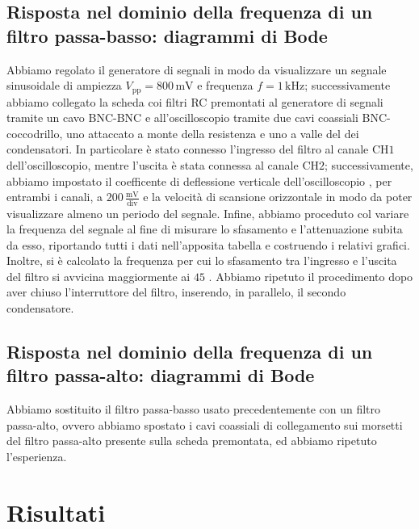 \documentclass{article}
\begin{document}
		\subsection{Risposta nel dominio della frequenza di un filtro passa-basso: diagrammi di Bode}
			Abbiamo regolato il generatore di segnali in modo da visualizzare un segnale sinusoidale di ampiezza $ V_{\mathrm{pp}} = 800 \, \mathrm{mV} $ e frequenza $ f = 1 \, \mathrm{kHz} $; successivamente abbiamo collegato la scheda coi filtri RC premontati al generatore di segnali tramite un cavo BNC-BNC e all'oscilloscopio tramite due cavi coassiali BNC-coccodrillo, uno attaccato a monte della resistenza e uno a valle del dei condensatori.
			\newline
			In particolare è stato connesso l'ingresso del filtro al canale $ \mathrm{CH1} $ dell'oscilloscopio, mentre l'uscita è stata connessa al canale $ \mathrm{CH2} $; successivamente, abbiamo impostato il coefficente di deflessione verticale dell'oscilloscopio , per entrambi i canali, a $ 200 \, \mathrm{\frac{mV}{div}} $ e la velocità di scansione orizzontale in modo da poter visualizzare almeno un periodo del segnale.
			\newline
			Infine, abbiamo proceduto col variare la frequenza del segnale al fine di misurare lo sfasamento e l'attenuazione subita da esso, riportando tutti i dati nell'apposita tabella e costruendo i relativi grafici. Inoltre, si è calcolato la frequenza per cui lo sfasamento tra l'ingresso e l'uscita del filtro si avvicina maggiormente ai $ 45 $ \textdegree.
			\newline
			Abbiamo ripetuto il procedimento dopo aver chiuso l'interruttore del filtro, inserendo, in parallelo, il secondo condensatore.
		\subsection{Risposta nel dominio della frequenza di un filtro passa-alto: diagrammi di Bode}
			Abbiamo sostituito il filtro passa-basso usato precedentemente con un filtro passa-alto, ovvero abbiamo spostato i cavi coassiali di collegamento sui morsetti del filtro passa-alto presente sulla scheda premontata, ed abbiamo ripetuto l'esperienza.
	\section{Risultati}
\end{document}
